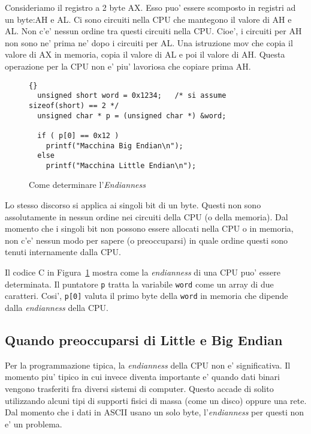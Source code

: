 Consideriamo il registro a 2 byte {\code AX}. Esso puo' essere scomposto
in registri ad un byte:{\code AH} e {\code AL}. Ci sono circuiti nella
CPU che mantegono il valore di {\code AH} e {\code AL}. Non c'e' nessun
ordine tra questi circuiti nella CPU. Cioe', i circuiti per {\code AH} non
sono ne' prima ne' dopo i circuiti per {\code AL}. Una istruzione {\code mov}
che copia il valore di {\code AX} in memoria, copia il valore di {\code AL}
e poi il valore di {\code AH}. Questa operazione per la CPU non e' piu'
lavoriosa che copiare prima {\code AH}.

\begin{figure}[t]
\begin{lstlisting}[stepnumber=0,frame=tblr]{}
  unsigned short word = 0x1234;   /* si assume sizeof(short) == 2 */
  unsigned char * p = (unsigned char *) &word;

  if ( p[0] == 0x12 )
    printf("Macchina Big Endian\n");
  else
    printf("Macchina Little Endian\n");
\end{lstlisting}
\caption{Come determinare l'\emph{Endianness} \label{fig:determineEndian}}
\end{figure}

Lo stesso discorso si applica ai singoli bit di un byte. Questi non sono
assolutamente in nessun ordine nei circuiti della CPU (o della memoria).
Dal momento che i singoli bit non possono essere allocati nella CPU o
in memoria, non c'e' nessun modo per sapere (o preoccuparsi) in quale
ordine questi sono tenuti internamente dalla CPU.

Il codice C in Figura~\ref{fig:determineEndian} mostra come la
\emph{endianness} di una CPU puo' essere determinata. Il puntatore
\lstinline|p| tratta la variabile \lstinline|word| come un array
di due caratteri. Cosi', \lstinline|p[0]| valuta il primo byte
della \lstinline|word| in memoria che dipende dalla \emph{endianness}
della CPU.

\subsection{Quando preoccuparsi di Little e Big Endian}

Per la programmazione tipica, la \emph{endianness} della CPU
non e' significativa. Il momento piu' tipico in cui invece diventa
importante e' quando dati binari vengono trasferiti fra diversi
sistemi di computer. Questo accade di solito utilizzando alcuni tipi
di supporti fisici di massa (come un disco) oppure una rete.  Dal momento che i dati in ASCII usano un solo byte,
l'\emph{endianness} per questi non e' un problema.


